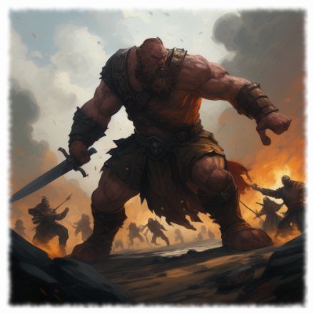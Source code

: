\begin{figure}[h]
\begin{center}
\includegraphics[scale=0.24]{img/ai-images/giant.png}
\end{center}
\end{figure}
